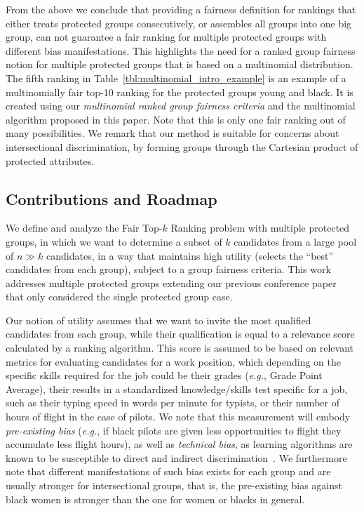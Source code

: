 From the above we conclude that providing a fairness definition for rankings that either treats protected groups consecutively, or assembles all groups into one big group, can not guarantee a fair ranking for multiple protected groups with different bias manifestations.
%
This highlights the need for a ranked group fairness notion for multiple protected groups that is based on a multinomial distribution.
%
The fifth ranking in Table~\ref{tbl:multinomial_intro_example} is an example of a multinomially fair top-10 ranking for the protected groups young and black.
%
It is created using our \textit{multinomial ranked group fairness criteria} and the multinomial \algoFAIR algorithm proposed in this paper.
%
Note that this is only one fair ranking out of many possibilities.
%
We remark that our method is suitable for concerns about intersectional discrimination, by forming groups through the Cartesian product of protected attributes.

\subsection{Contributions and Roadmap}
We define and analyze the {\sc Fair Top-$k$ Ranking problem} with multiple protected groups, in which we want to determine a subset of $k$ candidates from a large pool of $n \gg k$ candidates, in a way that maintains high utility (selects the ``best'' candidates from each group), subject to a group fairness criteria. This work addresses multiple protected groups extending our previous conference paper~\cite{zehlike2017fair} that only considered the single protected group case.
%
%

Our notion of utility assumes that we want to invite the most qualified candidates from each group, while their qualification is equal to a relevance score calculated by a ranking algorithm.
%
This score is assumed to be based on relevant metrics for evaluating candidates for a work position, which depending on the specific skills required for the job could be their grades ({\em e.g.}, Grade Point Average), their results in a standardized knowledge/skills test specific for a job, such as their typing speed in words per minute for typists, or their number of hours of flight in the case of pilots.
%
We note that this measurement will embody \emph{pre-existing bias} ({\em e.g.}, if black pilots are given less opportunities to flight they accumulate less flight hours), as well as \emph{technical bias}, as learning algorithms are known to be susceptible to direct and indirect discrimination~\cite{tuto2016,HajianFerrer12}.
%
We furthermore note that different manifestations of such bias exists for each group and are usually stronger for intersectional groups, that is, the pre-existing bias against black women is stronger than the one for women or blacks in general.
%

